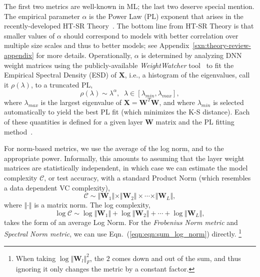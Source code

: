 The first two metrics are well-known in ML; the last two deserve special mention.
The empirical parameter $\alpha$ is the Power Law (PL) exponent that arises in the recently-developed HT-SR Theory~\cite{MM18_TR, MM19_HTSR_ICML, MM20_SDM}.
The bottom line from HT-SR Theory is that smaller values of $\alpha$ should correspond to models with better correlation over multiple size scales and thus to better models; see Appendix~\ref{sxn:theory-review-appendix} for more details.
Operationally, $\alpha$ is determined by analyzing DNN weight matrices using the publicly-available \emph{WeightWatcher} tool~\cite{weightwatcher_package} to fit the Empirical Spectral Density (ESD) of $\mathbf{X}$, i.e., a histogram of the eigenvalues, call it $\rho(\lambda)$, to a truncated PL, 
\begin{equation}
\rho(\lambda)\sim\lambda^{\alpha},\;\;\lambda\in[\lambda_{min},\lambda_{max}] ,
\end{equation}
where $\lambda_{max}$ is the largest eigenvalue of $\mathbf{X}=\mathbf{W}^{T}\mathbf{W}$, and 
where $\lambda_{min}$ is selected automatically to yield the best PL fit (which minimizes the K-S distance). 
Each of these quantities is defined for a given layer $\mathbf{W}$ matrix and the PL fitting method~\cite{CSN09_powerlaw,ABP14}.

For norm-based metrics, we use the average of the log norm, and to the appropriate power.
Informally, this amounts to assuming that the layer weight matrices are statistically independent, in which case we can estimate the model complexity $\mathcal{C}$, or test accuracy, with a standard Product Norm (which resembles a data dependent VC complexity),
\begin{equation}
\mathcal{C}\sim\Vert\mathbf{W}_{1}\Vert\times\Vert\mathbf{W}_{2}\Vert \times \cdots \times \Vert\mathbf{W}_{L}\Vert ,
\end{equation}
where $\Vert\cdot\Vert$ is a matrix norm.   
The log complexity,
\begin{equation}
\label{eqn:eqn:sum_log_norm}
\log\mathcal{C} \sim \log\Vert\mathbf{W}_{1}\Vert+\log\Vert\mathbf{W}_{2}\Vert + \cdots + \log\Vert\mathbf{W}_{L}\Vert  ,
\end{equation}
 takes the form of an average Log Norm.
For the \emph{Frobenius Norm metric} and \emph{Spectral Norm metric}, we can use Eqn.~(\ref{eqn:eqn:sum_log_norm}) directly.%
\footnote{When taking $\log\Vert\mathbf{W}_{l}\Vert_{F}^{2}$, the $2$ comes down and out of the sum, and thus ignoring it only changes the metric by a constant factor.}


